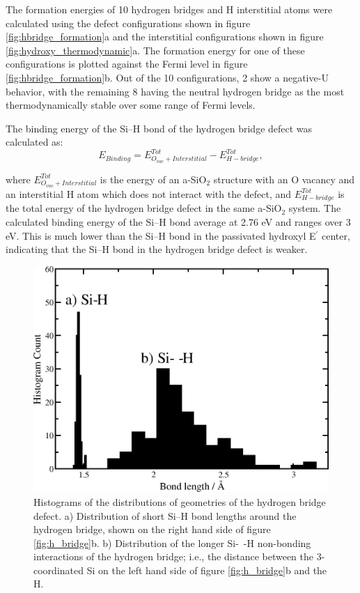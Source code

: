 \documentclass[aps,prb,reprint,superscriptaddress,showpacs]{revtex4-1}
\begin{document}
The formation energies of 10 hydrogen bridges and H interstitial atoms were calculated using the defect configurations shown in figure \ref{fig:hbridge_formation}a and the interstitial configurations shown in figure \ref{fig:hydroxy_thermodynamic}a. The formation energy for one of these configurations is plotted against the Fermi level in figure \ref{fig:hbridge_formation}b. Out of the 10 configurations, 2 show a negative-U behavior, with the remaining 8 having the neutral hydrogen bridge as the most thermodynamically stable over some range of Fermi levels. 

The binding energy of the \mbox{Si--H} bond of the hydrogen bridge defect was calculated as:
\begin{equation}
E_{Binding}=E^{Tot}_{O_{vac} + Interstitial}-E^{Tot}_{H-bridge},
\end{equation}

where $E^{Tot}_{O_{vac} + Interstitial}$ is the energy of an a-SiO$_2$ structure with an O vacancy and an interstitial H atom which does not interact with the defect, and $E^{Tot}_{H-bridge}$ is the total energy of the hydrogen bridge defect in the same a-SiO$_2$ system. The calculated binding energy of the \mbox{Si--H} bond average at 2.76 eV and ranges over 3 eV. This is much lower than the \mbox{Si--H} bond in the passivated hydroxyl E$^\prime$ center, indicating that the \mbox{Si--H} bond in the hydrogen bridge defect is weaker.


\begin{figure}
\includegraphics{hbridge_lengths_labelled.png}
\caption{Histograms of the distributions of geometries of the hydrogen bridge defect. a) Distribution of short \mbox{Si--H} bond lengths around the hydrogen bridge, shown on the right hand side of figure \ref{fig:h_bridge}b. b) Distribution of the longer \mbox{Si- -H} non-bonding interactions of the hydrogen bridge; i.e., the distance between the 3-coordinated Si on the left hand side of figure \ref{fig:h_bridge}b and the H.}
\label{fig:hbridge_dist}
\end{figure}
\end{document}
